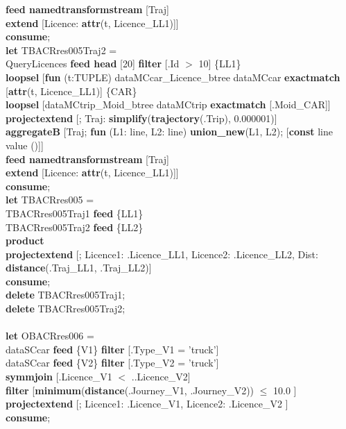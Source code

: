 \documentclass[a4paper]{article}
\newcommand{\op}[1]{\textbf{#1}}
\begin{document}
\begin{scriptsize}
\begin{tabbing}
\>\>\op{feed namedtransformstream} [Traj]\\
\>\>\op{extend} [Licence: \op{attr}(t, Licence\_LL1)]]\\
\op{consume};\\
\op{let} TBACRres005Traj2 =\\
\>QueryLicences \op{feed head} [20] \op{filter} [.Id $>$ 10] \{LL1\}\\
\>\op{loopsel} [\op{fun} (t:TUPLE) dataMCcar\_Licence\_btree dataMCcar \op{exactmatch} [\op{attr}(t, Licence\_LL1)] \{CAR\}\\
\>\>\op{loopsel} [dataMCtrip\_Moid\_btree dataMCtrip \op{exactmatch} [.Moid\_CAR]]\\
\>\>\op{projectextend} [; Traj: \op{simplify}(\op{trajectory}(.Trip), 0.000001)]\\
\>\>\op{aggregateB} [Traj; \op{fun} (L1: line, L2: line) \op{union\_new}(L1, L2); [\op{const} line value ()]]\\
\>\>\op{feed namedtransformstream} [Traj]\\
\>\>\op{extend} [Licence: \op{attr}(t, Licence\_LL1)]]\\
\op{consume};\\
\op{let} TBACRres005 = \\
\>TBACRres005Traj1 \op{feed} \{LL1\}\\
\>TBACRres005Traj2 \op{feed} \{LL2\}\\
\>\op{product}\\
\>\op{projectextend} [; Licence1: .Licence\_LL1, Licence2: .Licence\_LL2, Dist: \op{distance}(.Traj\_LL1, .Traj\_LL2)]\\
\op{consume};\\
\op{delete} TBACRres005Traj1;\\
\op{delete} TBACRres005Traj2;\\
\\
\op{let} OBACRres006 =\\
\>dataSCcar \op{feed} \{V1\} \op{filter} [.Type\_V1 = 'truck']\\
\>dataSCcar \op{feed} \{V2\} \op{filter} [.Type\_V2 = 'truck']\\
\>\op{symmjoin} [.Licence\_V1 $<$ ..Licence\_V2]\\
\>\op{filter} [\op{minimum}(\op{distance}(.Journey\_V1, .Journey\_V2)) $\leq$ 10.0 ]\\
\>\op{projectextend} [; Licence1: .Licence\_V1, Licence2: .Licence\_V2 ]\\
\op{consume};\\
\\

\end{tabbing}
\end{scriptsize}
\end{document}
